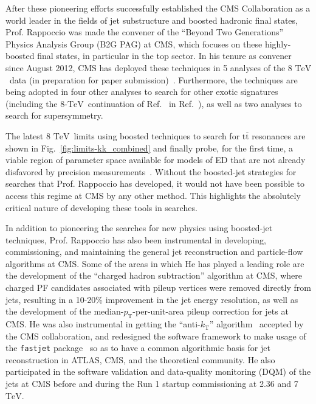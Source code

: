 \documentclass[12pt]{proposalnsf}
\newcommand{\TeV}{\ensuremath{\mathrm{TeV}}}
\newcommand{\ttbar}        {\ensuremath{\mathrm{t}\overline{\mathrm{t}}}}
\begin{document}
After these pioneering efforts successfully established the CMS
Collaboration as a world leader in the fields of jet substructure and
boosted hadronic final states, Prof. Rappoccio
was made the convener of the ``Beyond Two Generations'' Physics
Analysis Group (B2G PAG) at CMS, which focuses on these highly-boosted
final states, in particular in the top sector. 
In his tenure as convener since August 2012, CMS has deployed these
techniques in 5 analyses of the 8 \TeV\ data (in preparation for paper 
submission)~\cite{B2G-12-005,B2G-12-006,B2G-12-012,B2G-12-015,B2G-12-019}. 
Furthermore, the techniques are being adopted in four other
analyses to search for other exotic signatures (including the 8-\TeV\
continuation of Ref.~\cite{EXO-11-095} in Ref.~\cite{EXO-12-024}), as
well as two analyses to search for supersymmetry. 

The latest 8 \TeV\ limits using boosted
techniques to search for $\ttbar$ resonances are shown in
Fig.~\ref{fig:limits-kk_combined} and finally probe, for
the first time, a viable region of parameter space available for
models of ED that are not already disfavored by
precision measurements~\cite{Davoudiasl:2009cd}. 
Without the boosted-jet strategies for searches that Prof. Rappoccio has
developed, it would not have been possible to access this regime at
CMS by any other method. This highlights the absolutely critical
nature of developing these tools in searches. 



In addition to pioneering the searches for new physics using
boosted-jet techniques, Prof. Rappoccio has also been instrumental in developing,
commissioning, and maintaining the general jet reconstruction and
particle-flow algorithms at CMS. Some of the areas in which
He has played a leading role are the development of the ``charged
hadron subtraction'' algorithm at CMS, where charged PF candidates
associated with pileup vertices were removed directly from
jets, resulting in a 10-20\% improvement in the jet energy
resolution, as well as the development of the
median-$p_\mathrm{T}$-per-unit-area pileup correction for jets at CMS. He was also
instrumental in getting the ``anti-$k_\mathrm{T}$'' algorithm~\cite{ktalg} accepted
by the CMS collaboration, and redesigned the software framework to
make usage of the {\tt fastjet} package~\cite{fastjet,fastjet1} so as to have a
common algorithmic basis for jet reconstruction in ATLAS, CMS, and the
theoretical community. He also
participated in the software validation and
data-quality monitoring (DQM) of the jets at CMS before and during the
Run 1 startup commissioning at 2.36 and 7 \TeV. 
\end{document}
